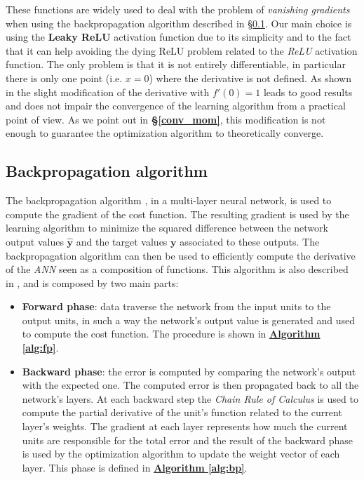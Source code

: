 These functions are widely used to deal with the problem of \textit{vanishing gradients} when using the backpropagation algorithm described in \S\ref{backprop}. Our main choice is using the \textbf{Leaky ReLU} activation function due to its simplicity and to the fact that it can help avoiding the dying ReLU problem related to the \textit{ReLU} activation function. The only problem is that it is not entirely differentiable, in particular there is only one point (i.e. $x=0$) where the derivative is not defined. As shown in \parencite[Chap. 6.3]{bengio} the slight modification of the derivative with \textit{$f'(0) = 1$} leads to good results and does not impair the convergence of the learning algorithm from a practical point of view. As we point out in \textbf{\S\ref{conv_mom}}, this modification is not enough to guarantee the optimization algorithm to theoretically converge.

\subsection{Backpropagation algorithm}
\label{backprop}
The backpropagation algorithm \parencite[see][Chap. 6.5.4]{bengio}, in a multi-layer neural network, is used to compute the gradient of the cost function. The resulting gradient is used by the learning algorithm to minimize the squared difference between the network output values $\hat{\textbf{y}}$ and the target values $\textbf{y}$ associated to these outputs. The backpropagation algorithm can then be used to efficiently compute the derivative of the \textit{ANN} seen as a composition of functions.\newline
This algorithm is also described in \cite{MLmitchell}, \cite{haykin_neural_2009} and is composed by two main parts:
\begin{itemize}
    \item \textbf{Forward phase}: data traverse the network from the input units to the output units, in such a way the network's output value is generated and used to compute the cost function. The procedure is shown in \hyperref[alg:fp]{\textbf{Algorithm \ref{alg:fp}}}.
    \item \textbf{Backward phase}: the error is computed by comparing the network's output with the expected one. The computed error is then propagated back to all the network's layers. At each backward step the \textit{Chain Rule of Calculus} is used to compute the partial derivative of the unit's function related to the current layer's weights. The gradient at each layer represents how much the current units are responsible for the total error and the result of the backward phase is used by the optimization algorithm to update the weight vector of each layer. This phase is defined in \hyperref[alg:bp]{\textbf{Algorithm \ref{alg:bp}}}.
\end{itemize}

